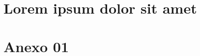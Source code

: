 
\setlength\bibitemsep{12pt} %





\apendices
\partapendices
\chapter{Lorem ipsum dolor sit amet}

\lipsum[21-26]


\anexos
\partanexos

\chapter{Anexo 01}
\lipsum[26-32]